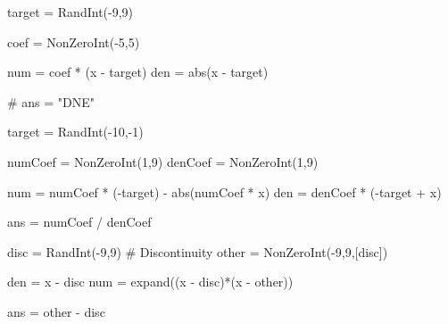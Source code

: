 \begin{sagesilent}

target = RandInt(-9,9)

coef = NonZeroInt(-5,5)

num = coef * (x - target)
den = abs(x - target)

# ans = "DNE"
\end{sagesilent}


\begin{sagesilent}

target = RandInt(-10,-1)

numCoef = NonZeroInt(1,9)
denCoef = NonZeroInt(1,9)

num = numCoef * (-target) - abs(numCoef * x)
den = denCoef * (-target + x)

ans = numCoef / denCoef
\end{sagesilent}


\begin{sagesilent}

disc = RandInt(-9,9) # Discontinuity
other = NonZeroInt(-9,9,[disc])

den = x - disc
num = expand((x - disc)*(x - other))

ans = other - disc

\end{sagesilent}

